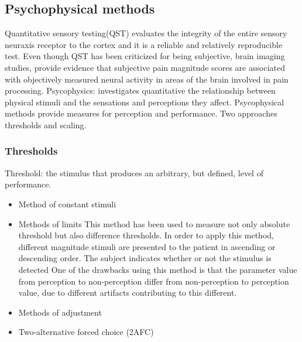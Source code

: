 \subsection{Psychophysical methods}
Quantitative sensory testing(QST) evaluates the integrity of the entire sensory neuraxis receptor to the cortex and it is a reliable and relatively reproducible test. Even though QST has been criticized for being subjective, brain imaging studies, provide evidence that subjective pain magnitude scores are associated with objectively measured neural activity in areas of the brain involved in pain processing.
Psycophysics: investigates quantitative the relationship between physical stimuli and the sensations and perceptions they affect.
Psycophysical methods provide measures for perception and performance. Two approaches thresholds and scaling.

\subsubsection{Thresholds}
Threshold: the stimulus that produces an arbitrary, but defined, level of performance.
\begin{itemize}
	\item Method of constant stimuli
	
	\item Methods of limits
	This method has been used to measure not only absolute threshold but also difference thresholds. In order to apply this method, different magnitude stimuli are presented to the patient in ascending or descending order. The subject indicates whether or not the stimulus is detected
	One of the drawbacks using this method is that the parameter value from perception to non-perception differ from non-perception to perception value, due to different artifacts contributing to this different.
	\item Methods of adjustment
	\item Two-alternative forced choice (2AFC)
\end{itemize}